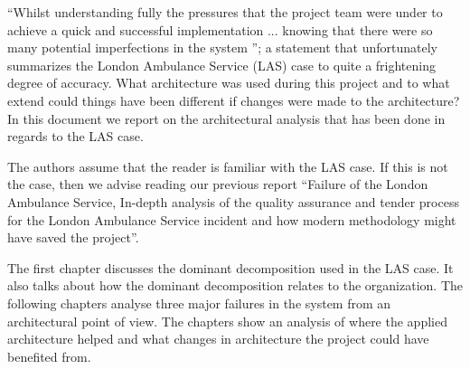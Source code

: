 ``Whilst understanding fully the pressures that the project team were under to achieve a quick and successful implementation ...
knowing that there were so many potential imperfections in the system \cite[s4002]{officialreport}'';
a statement that unfortunately summarizes the London Ambulance Service (LAS) case to quite a frightening degree of accuracy.
What architecture was used during this project and to what extend could things have been different if changes were made to the architecture?
In this document we report on the architectural analysis that has been done in regards to the LAS case.

The authors assume that the reader is familiar with the LAS case.
If this is not the case, then we advise reading our previous report
``Failure of the London Ambulance Service, In-depth analysis of the quality assurance and tender process for the London Ambulance Service incident and how modern methodology might have saved the project''.

The first chapter discusses the dominant decomposition used in the LAS case.
It also talks about how the dominant decomposition relates to the organization.
The following chapters analyse three major failures in the system from an architectural point of view.
The chapters show an analysis of where the applied architecture helped and what changes in architecture the project could have benefited from.
